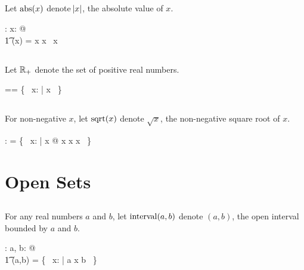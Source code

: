 \documentclass[11pt, oneside]{article}
\begin{document}
\subsection{}

Let $\operatorname{abs}(x)$ denote $\abs{x}$, the absolute value of $x$.

\begin{axdef}
	\absR: \R \fun \R
\where
	\forall x: \R @ \\
	\t1	\absR(x) = \IF x \geR \zeroR \THEN x \ELSE \negR~x
\end{axdef}

\subsection{}

Let $\mathbb{R}_{+}$ denote the set of positive real numbers.

\begin{zed}
	\Rpos == \{~ x: \R | x \gtR \zeroR ~\}
\end{zed}

\subsection{}

For non-negative $x$, let $\operatorname{sqrt}(x)$ denote $\sqrt{x}$, the non-negative square root of $x$.

\begin{axdef}
	\sqrtR: \R \pfun \R
\where
	\sqrtR = \{~ x: \R | x \geR \zeroR @ x \mulR x \mapsto x ~\}
\end{axdef}

\section{Open Sets}

\subsection{}

For any real numbers $a$ and $b$, let $\operatorname{interval}(a,b)$ denote $(a,b)$, the open interval bounded by $a$ and $b$.

\begin{axdef}
	\intervalRR: \R \cross \R \fun \power \R
\where
	\forall a, b: \R @ \\
	\t1	\intervalRR(a,b) = \{~ x: \R | a \ltR x \ltR b ~\}
\end{axdef}
\end{document}
